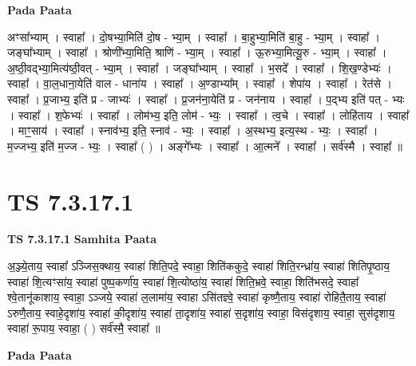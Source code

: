 \documentclass[17pt]{extarticle}
\begin{document}
\textbf{Pada Paata} \newline

अꣳसा᳚भ्याम् । स्वाहा᳚ । दो॒षभ्या॒मिति॑ दो॒ष - भ्या॒म् । स्वाहा᳚ । बा॒हुभ्या॒मिति॑ बा॒हु - भ्या॒म् । स्वाहा᳚ । जङ्घा᳚भ्याम् । स्वाहा᳚ । श्रोणी᳚भ्या॒मिति॒ श्राणि॑ - भ्या॒म् । स्वाहा᳚ । ऊ॒रुभ्या॒मित्यू॒रु - भ्या॒म् । स्वाहा᳚ । अ॒ष्ठी॒वद्भ्या॒मित्य॑ष्ठी॒वत् - भ्या॒म् । स्वाहा᳚ । जङ्घा᳚भ्याम् । स्वाहा᳚ । भ॒सदे᳚ । स्वाहा᳚ । शि॒ख॒ण्डेभ्यः॑ । स्वाहा᳚ । वा॒ल॒धाना॒येति॑ वाल - धाना॑य । स्वाहा᳚ । अ॒ण्डाभ्या᳚म् । स्वाहा᳚ । शेपा॑य । स्वाहा᳚ । रेत॑से । स्वाहा᳚ । प्र॒जाभ्य॒ इति॑ प्र - जाभ्यः॑ । स्वाहा᳚ । प्र॒जन॑ना॒येति॑ प्र - जन॑नाय । स्वाहा᳚ । प॒द्भ्य इति॑ पत् - भ्यः । स्वाहा᳚ । श॒फेभ्यः॑ । स्वाहा᳚ । लोम॑भ्य॒ इति॒ लोम॑ - भ्यः॒ । स्वाहा᳚ । त्व॒चे । स्वाहा᳚ । लोहि॑ताय । स्वाहा᳚ । माꣳ॒॒साय॑ । स्वाहा᳚ । स्नाव॑भ्य॒ इति॒ स्नाव॑ - भ्यः॒ । स्वाहा᳚ । अ॒स्थभ्य॒ इत्य॒स्थ - भ्यः॒ । स्वाहा᳚ । म॒ज्जभ्य॒ इति॑ म॒ज्ज - भ्यः॒ । स्वाहा᳚ ( ) । अङ्गे᳚भ्यः । स्वाहा᳚ । आ॒त्मने᳚ । स्वाहा᳚ । सर्व॑स्मै । स्वाहा᳚ ॥  \newline





\section{ TS 7.3.17.1 }

\textbf{TS 7.3.17.1 } \newline
\textbf{Samhita Paata} \newline

अ॒ञ्ज्ये॒ताय॒ स्वाहा᳚ ऽञ्जिस॒क्थाय॒ स्वाहा॑ शिति॒पदे॒ स्वाहा॒ शिति॑ककुदे॒ स्वाहा॑ शिति॒रन्ध्रा॑य॒ स्वाहा॑ शितिपृ॒ष्ठाय॒ स्वाहा॑ शि॒त्यꣳसा॑य॒ स्वाहा॑ पुष्प॒कर्णा॑य॒ स्वाहा॑ शि॒त्योष्ठा॑य॒ स्वाहा॑ शिति॒भ्रवे॒ स्वाहा॒ शिति॑भसदे॒ स्वाहा᳚ श्वे॒तानू॑काशाय॒ स्वाहा॒ ऽञ्जये॒ स्वाहा॑ ल॒लामा॑य॒ स्वाहा ऽसि॑तज्ञ्वे॒ स्वाहा॑ कृष्णै॒ताय॒ स्वाहा॑ रोहितै॒ताय॒ स्वाहा॑ ऽरुणै॒ताय॒ स्वाहे॒दृशा॑य॒ स्वाहा॑ की॒दृशा॑य॒ स्वाहा॑ ता॒दृशा॑य॒ स्वाहा॑ स॒दृशा॑य॒ स्वाहा॒ विस॑दृशाय॒ स्वाहा॒ सुस॑दृशाय॒ स्वाहा॑ रू॒पाय॒ स्वाहा॒ ( ) सर्व॑स्मै॒ स्वाहा᳚ ॥ \newline

\textbf{Pada Paata} \newline
\end{document}
